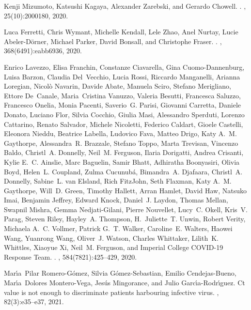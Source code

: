 \documentclass[12pt]{article}
\begin{document}
\begin{thebibliography}{10}
Kenji Mizumoto, Katsushi Kagaya, Alexander Zarebski, and Gerardo Chowell.
.
, 25(10):2000180, 2020.

Luca Ferretti, Chris Wymant, Michelle Kendall, Lele Zhao, Anel Nurtay, Lucie
  Abeler-D{\"o}rner, Michael Parker, David Bonsall, and Christophe Fraser.
.
, 368(6491):eabb6936, 2020.

Enrico Lavezzo, Elisa Franchin, Constanze Ciavarella, Gina Cuomo-Dannenburg,
  Luisa Barzon, Claudia Del~Vecchio, Lucia Rossi, Riccardo Manganelli, Arianna
  Loregian, Nicol{\`o} Navarin, Davide Abate, Manuela Sciro, Stefano
  Merigliano, Ettore De~Canale, Maria~Cristina Vanuzzo, Valeria Besutti,
  Francesca Saluzzo, Francesco Onelia, Monia Pacenti, Saverio~G. Parisi,
  Giovanni Carretta, Daniele Donato, Luciano Flor, Silvia Cocchio, Giulia Masi,
  Alessandro Sperduti, Lorenzo Cattarino, Renato Salvador, Michele Nicoletti,
  Federico Caldart, Gioele Castelli, Eleonora Nieddu, Beatrice Labella,
  Ludovico Fava, Matteo Drigo, Katy A.~M. Gaythorpe, Alessandra~R. Brazzale,
  Stefano Toppo, Marta Trevisan, Vincenzo Baldo, Christl~A. Donnelly, Neil~M.
  Ferguson, Ilaria Dorigatti, Andrea Crisanti, Kylie E.~C. Ainslie, Marc
  Baguelin, Samir Bhatt, Adhiratha Boonyasiri, Olivia Boyd, Helen~L. Coupland,
  Zulma Cucunub{\'a}, Bimandra~A. Djafaara, Christl~A. Donnelly, Sabine~L. van
  Elsland, Rich FitzJohn, Seth Flaxman, Katy A.~M. Gaythorpe, Will~D. Green,
  Timothy Hallett, Arran Hamlet, David Haw, Natsuko Imai, Benjamin Jeffrey,
  Edward Knock, Daniel~J. Laydon, Thomas Mellan, Swapnil Mishra, Gemma
  Nedjati-Gilani, Pierre Nouvellet, Lucy~C. Okell, Kris~V. Parag, Steven Riley,
  Hayley~A. Thompson, H.~Juliette~T. Unwin, Robert Verity, Michaela A.~C.
  Vollmer, Patrick G.~T. Walker, Caroline~E. Walters, Haowei Wang, Yuanrong
  Wang, Oliver~J. Watson, Charles Whittaker, Lilith~K. Whittles, Xiaoyue Xi,
  Neil~M. Ferguson, and {Imperial College COVID-19 Response Team}.
.
, 584(7821):425--429, 2020.

Mar{\'\i}a~Pilar Romero-G{\'o}mez, Silvia G{\'o}mez-Sebastian, Emilio
  Cendejas-Bueno, Mar{\'\i}a~Dolores Montero-Vega, Jes{\'u}s Mingorance, and
  Julio Garc{\'\i}a-Rodr{\'\i}guez.
\newblock Ct value is not enough to discriminate patients harbouring infective
  virus.
, 82(3):e35--e37, 2021.


\end{thebibliography}
\end{document}
